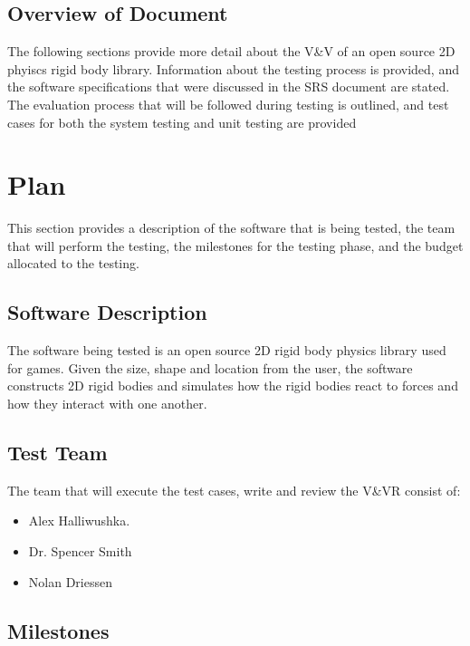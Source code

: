 \documentclass[12pt]{article}
\begin{document}
\subsection{Overview of Document }
The following sections provide more detail about the V\&V of an open source 2D phyiscs rigid body
library. Information about the testing process is provided, and the software specifications
that were discussed in the SRS document are stated.  The evaluation process that will be followed during 
testing is outlined, and test cases for both the system testing and unit testing are provided 

%
%

\section{Plan}
This section provides a description of the software that is being tested, the team that will
perform the testing, the milestones for the testing phase, and the budget allocated to the testing. 

\subsection{Software Description}
The software being tested is an open source 2D rigid body physics library used for games. Given the size, shape 
and location from the user, the software constructs 2D rigid bodies and simulates how the rigid bodies react to 
forces and how they interact with one another.  

\subsection{Test Team} 
The team that will execute the test cases, write and review the V\&VR consist of:

\begin{itemize}
 \item Alex Halliwushka. 
 \item Dr. Spencer Smith
 \item Nolan Driessen
\end{itemize}  

\subsection{Milestones}
\end{document}
